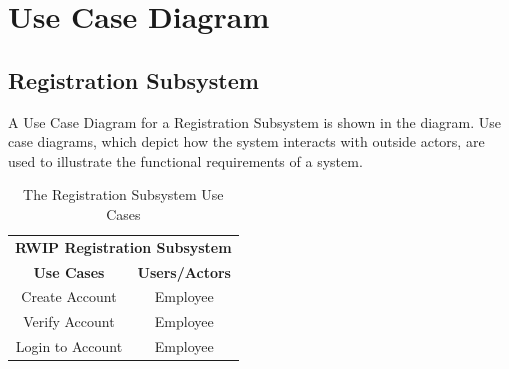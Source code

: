 \section{Use Case Diagram}

\subsection{Registration Subsystem}
A Use Case Diagram for a Registration Subsystem is shown in the diagram. Use case diagrams, which depict how the system interacts with outside actors, are used to illustrate the functional requirements of a system. 


\begin{table}[h!t]
    \caption{The Registration Subsystem Use Cases}
    {%
    \newcommand{\mc}[2]{\multicolumn{#1}{#2}}
    \begin{center}
    \begin{tabular}{|c|c|}
    \hline
    \multicolumn{2}{|c|}{\textbf{RWIP Registration Subsystem}} \\ \cline{1-2}
    \textbf{Use Cases} & \textbf{Users/Actors} \\
    \hline
    \rule{0pt}{24pt}  Create Account & Employee \\
    \hline
    \rule{0pt}{24pt}  Verify Account & Employee \\
    \hline
    \rule{0pt}{24pt}  Login to Account & Employee \\
    \hline
    \end{tabular}
    \end{center}
    }%
    \label{tab:reg}
\end{table}


